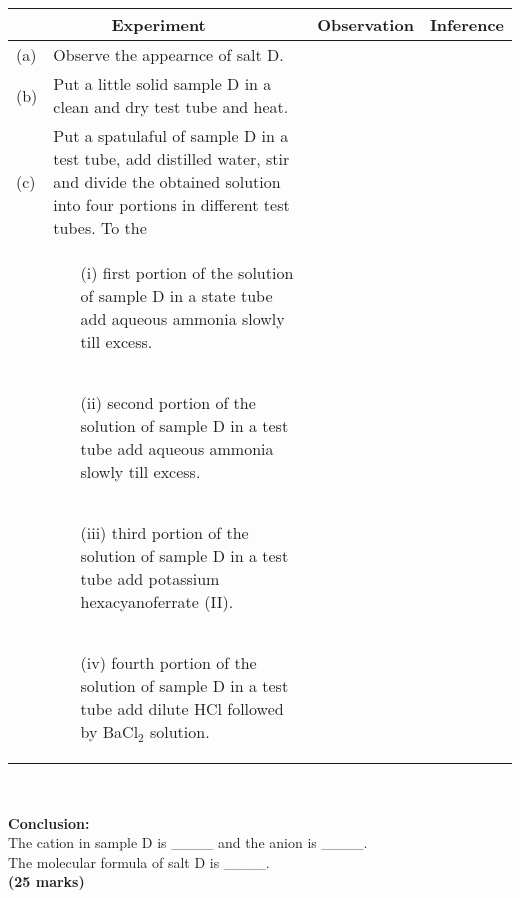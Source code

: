 \begin{enumerate}
\begin{center}
\begin{tabular}{|l|p{8cm}|l|l|}
\hline
\multicolumn{2}{|c|}{\textbf{Experiment}}&\textbf{Observation}&\textbf{Inference}\\ \hline
(a)&Observe the appearnce of salt D.&&\\ \hline
(b)&Put a little solid sample D in a clean and dry test tube and heat.&&\\ \hline
(c)&Put a spatulaful of sample D in a test tube, add distilled water, stir and divide the obtained solution into four portions in different test tubes. To the&&\\ \hline
&\begin{enumerate}
\item[(i)] first portion of the solution of sample D in a state tube add aqueous ammonia slowly till excess.
\end{enumerate}&&\\ \hline
&\begin{enumerate}
\item[(ii)] second portion of the solution of sample D in a test tube add aqueous ammonia slowly till excess.
\end{enumerate}&&\\ \hline
&\begin{enumerate}
\item[(iii)] third portion of the solution of sample D in a test tube add potassium hexacyanoferrate (II).
\end{enumerate}&&\\ \hline
&\begin{enumerate}
\item[(iv)] fourth portion of the solution of sample D in a test tube add dilute HCl followed by BaCl$_2$ solution.
\end{enumerate}&&\\ \hline
\end{tabular}\\

\end{center}


\textbf{Conclusion:}\\
\vspace{6pt}
The cation in sample D is \_\_\_\_ and the anion is \_\_\_\_.\\
The molecular formula of salt D is \_\_\_\_.\\

\raggedleft \textbf{(25 marks)}


\end{enumerate}
